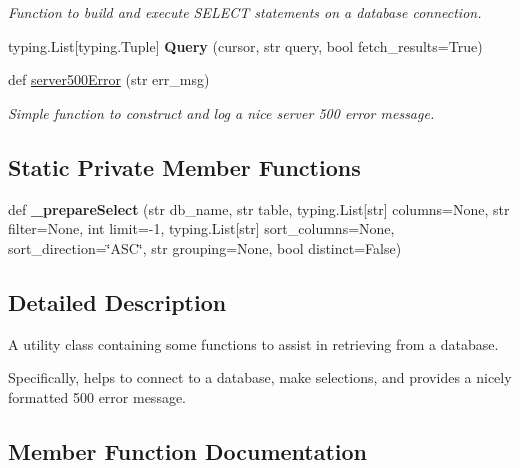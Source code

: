 \begin{DoxyCompactItemize}
\begin{DoxyCompactList}\small\item\em Function to build and execute S\+E\+L\+E\+CT statements on a database connection. \end{DoxyCompactList}\item 
\mbox{\label{classutils_1_1_s_q_l_af152813f7d7923bad1ecb883177c5030}} 
typing.\+List\mbox{[}typing.\+Tuple\mbox{]} {\bfseries Query} (cursor, str query, bool fetch\+\_\+results=True)
\item 
def \mbox{\hyperlink{classutils_1_1_s_q_l_aa45d1f8a1dc595e0156e3acda4310295}{server500\+Error}} (str err\+\_\+msg)
\begin{DoxyCompactList}\small\item\em Simple function to construct and log a nice server 500 error message. \end{DoxyCompactList}\end{DoxyCompactItemize}
\subsection*{Static Private Member Functions}
\begin{DoxyCompactItemize}
\item 
\mbox{\label{classutils_1_1_s_q_l_abfb0ac8f802c09a77409dbd1da9ea9fd}} 
def {\bfseries \+\_\+prepare\+Select} (str db\+\_\+name, str table, typing.\+List\mbox{[}str\mbox{]} columns=None, str filter=None, int limit=-\/1, typing.\+List\mbox{[}str\mbox{]} sort\+\_\+columns=None, sort\+\_\+direction=\char`\"{}A\+SC\char`\"{}, str grouping=None, bool distinct=False)
\end{DoxyCompactItemize}


\subsection{Detailed Description}
A utility class containing some functions to assist in retrieving from a database. 

Specifically, helps to connect to a database, make selections, and provides a nicely formatted 500 error message. 

\subsection{Member Function Documentation}
\mbox{\label{classutils_1_1_s_q_l_a4130ca2a1312987f2284f2ac1667b860}} 
